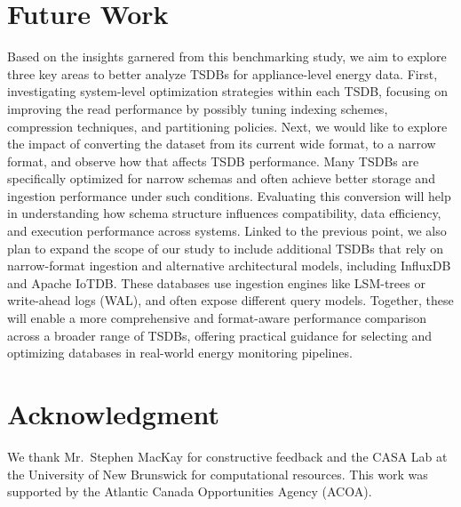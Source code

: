 \documentclass[conference]{IEEEtran}
\begin{document}
\section{Future Work}\label{sec:future}
Based on the insights garnered from this benchmarking study, we aim to explore three key areas to better analyze TSDBs for appliance-level energy data. 
First, investigating system-level optimization strategies within each TSDB, focusing on improving the read performance by possibly tuning indexing schemes, compression techniques, and partitioning policies. 
Next, we would like to explore the impact of converting the dataset from its current wide format, to a narrow format, and observe how that affects TSDB performance. Many TSDBs are specifically optimized for narrow schemas and often achieve better storage and ingestion performance under such conditions. Evaluating this conversion will help in understanding how schema structure influences compatibility, data efficiency, and execution performance across systems.
Linked to the previous point, we also plan to expand the scope of our study to include additional TSDBs that rely on narrow-format ingestion and alternative architectural models, including InfluxDB and Apache IoTDB\@. These databases use ingestion engines like LSM-trees or write-ahead logs (WAL), and often expose different query models. Together, these will enable a more comprehensive and format-aware performance comparison across a broader range of TSDBs, offering practical guidance for selecting and optimizing databases in real-world energy monitoring pipelines.

\section*{Acknowledgment}
We thank Mr.~Stephen MacKay for constructive feedback and the CASA Lab at the University of New Brunswick for computational resources. This work was supported by the Atlantic Canada Opportunities Agency (ACOA).
\end{document}
